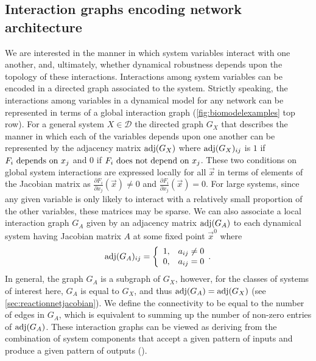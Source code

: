 \subsection{Interaction graphs encoding network architecture}
We are interested in the manner in which system variables interact with one another, and, ultimately, whether dynamical robustness depends upon the topology of these interactions. Interactions among system variables can be encoded in a directed graph associated to the system. Strictly speaking, the interactions among variables in a dynamical model for any network can be represented in terms of a global interaction graph (\ref{fig:biomodelexamples} top row).
For a general system $X \in \mathcal{D}$ the directed graph $G_X$ that describes the manner in which each of the variables depends upon one another can be represented by the adjacency matrix $\mathrm{adj}(G_X)$ where $\mathrm{adj}(G_X)_{ij}$ is $1$ if $F_i \hbox{ depends on } x_j$ and $0$ if $F_i \hbox{ does not depend on } x_j$. These two conditions on global system interactions are expressed locally for all $\vec{x}$ in terms of elements of the Jacobian matrix as $\frac{\partial F_i}{\partial x_j}(\vec{x}) \neq 0$ and $\frac{\partial F_i}{\partial x_j}(\vec{x}) = 0$.
For large systems, since any given variable is only likely to interact with a relatively small proportion of the other variables, these matrices may be sparse.
We can also associate a local interaction graph $G_A$ given by an adjacency matrix $\mathrm{adj}(G_A)$ to each dynamical system having Jacobian matrix $A$ at some fixed point $\vec{x}^0$ where
 \begin{equation}\label{eq:lininterdepadj}
   \mathrm{adj}(G_A)_{ij} = \left\{
     \begin{array}{lr}
       1, & a_{ij} \neq 0\\
       0, & a_{ij} = 0
     \end{array}.
   \right.
\end{equation}
In general, the graph $G_A$ is a subgraph of $G_X$, however, for the classes of systems of interest here, $G_A$ is equal to $G_X$, and thus $\mathrm{adj}(G_A) = \mathrm{adj}(G_X)$ (see  \ref{sec:reactionnetjacobian}). We define the connectivity to be equal to the number of edges in $G_A$, which is equivalent to summing up the number of non-zero entries of $\mathrm{adj}(G_A)$.
These interaction graphs can be viewed as deriving from the combination of system components that accept a given pattern of inputs and produce a given pattern of outputs ().

